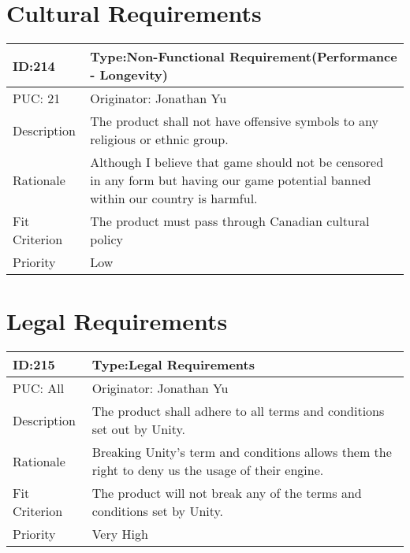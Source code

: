 \documentclass{article}
\begin{document}
	\section{Cultural Requirements}
	\begin{table}[H]
		\begin{tabular}{|l|l|l|}
			\hline
			ID:214 & \multicolumn{2}{l|}{Type:Non-Functional Requirement(Performance - Longevity)} \\ \hline
			PUC: 21 & \multicolumn{2}{l|}{Originator: Jonathan Yu} \\ \hline
			Description & \multicolumn{2}{m{0.85\textwidth}|}{The product shall not have offensive symbols to any religious or ethnic group.} \\ \hline
			Rationale & \multicolumn{2}{m{0.85\textwidth}|}{Although I believe that game should not be censored in any form but having our game potential banned within our country is harmful.} \\ \hline
			Fit Criterion & \multicolumn{2}{m{0.85\textwidth}|}{The product must pass through Canadian cultural policy} \\ \hline
			Priority& \multicolumn{2}{m{0.85\textwidth}|}{Low }\\ \hline
		\end{tabular}
	\end{table}

	\section{Legal Requirements}
	\begin{table}[H]
		\begin{tabular}{|l|l|l|}
			\hline
			ID:215 & \multicolumn{2}{l|}{Type:Legal Requirements} \\ \hline
			PUC: All & \multicolumn{2}{l|}{Originator: Jonathan Yu} \\ \hline
			Description & \multicolumn{2}{m{0.85\textwidth}|}{The product shall adhere to all terms and conditions set out by Unity.} \\ \hline
			Rationale & \multicolumn{2}{m{0.85\textwidth}|}{Breaking Unity’s term and conditions allows them the right to deny us the usage of their engine.} \\ \hline
			Fit Criterion & \multicolumn{2}{m{0.85\textwidth}|}{The product will not break any of the terms and conditions set by Unity.} \\ \hline
			Priority& \multicolumn{2}{m{0.85\textwidth}|}{Very High} \\ \hline
		\end{tabular}
	\end{table}
\end{document}
